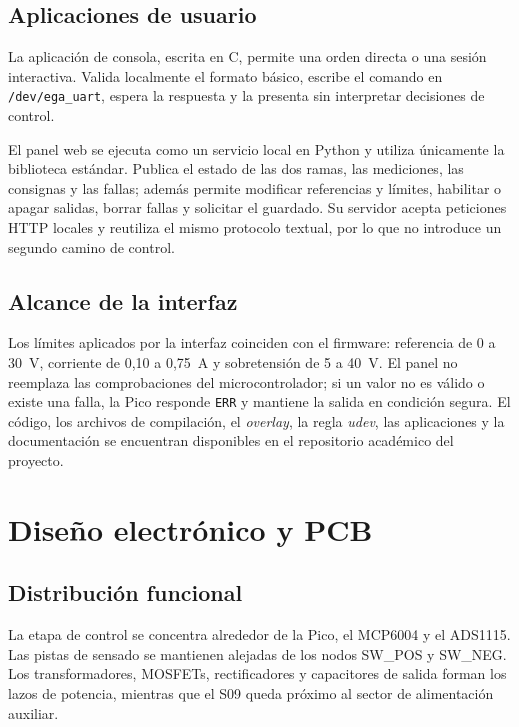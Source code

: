 \documentclass[conference]{IEEEtran}
\begin{document}
\subsection{Aplicaciones de usuario}

La aplicación de consola, escrita en C, permite una orden directa o una sesión interactiva. Valida localmente el formato básico, escribe el comando en \texttt{/dev/ega\_uart}, espera la respuesta y la presenta sin interpretar decisiones de control.

El panel web se ejecuta como un servicio local en Python y utiliza únicamente la biblioteca estándar. Publica el estado de las dos ramas, las mediciones, las consignas y las fallas; además permite modificar referencias y límites, habilitar o apagar salidas, borrar fallas y solicitar el guardado. Su servidor acepta peticiones HTTP locales y reutiliza el mismo protocolo textual, por lo que no introduce un segundo camino de control.

\subsection{Alcance de la interfaz}

Los límites aplicados por la interfaz coinciden con el firmware: referencia de 0 a 30~V, corriente de 0,10 a 0,75~A y sobretensión de 5 a 40~V. El panel no reemplaza las comprobaciones del microcontrolador; si un valor no es válido o existe una falla, la Pico responde \texttt{ERR} y mantiene la salida en condición segura. El código, los archivos de compilación, el \textit{overlay}, la regla \textit{udev}, las aplicaciones y la documentación se encuentran disponibles en el repositorio académico del proyecto.

\section{Diseño electrónico y PCB}

\subsection{Distribución funcional}

La etapa de control se concentra alrededor de la Pico, el MCP6004 y el ADS1115. Las pistas de sensado se mantienen alejadas de los nodos SW\_POS y SW\_NEG. Los transformadores, MOSFETs, rectificadores y capacitores de salida forman los lazos de potencia, mientras que el S09 queda próximo al sector de alimentación auxiliar.
\end{document}
